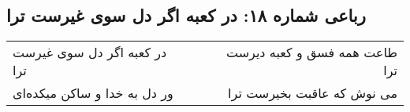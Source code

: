 \begin{center}
\section*{رباعی شماره ۱۸: در کعبه اگر دل سوی غیرست ترا}
\label{sec:sh018}
\begin{longtable}{l p{0.5cm} r}
در کعبه اگر دل سوی غیرست ترا
&&
طاعت همه فسق و کعبه دیرست ترا
\\
ور دل به خدا و ساکن میکده‌ای
&&
می نوش که عاقبت بخیرست ترا
\\
\end{longtable}
\end{center}
